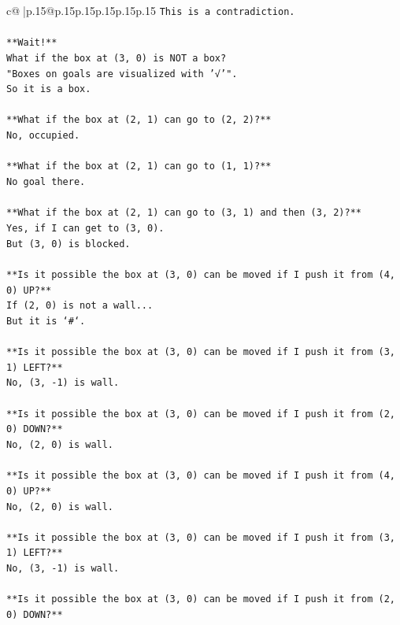 \documentclass{article}
\begin{document}
{\begin{supertabular}{c@{$\;$}|p{.15\linewidth}@{}p{.15\linewidth}p{.15\linewidth}p{.15\linewidth}p{.15\linewidth}p{.15\linewidth}}
{{{\texttt{This is a contradiction.} \\
\\ 
\texttt{**Wait!**} \\
\texttt{What if the box at (3, 0) is NOT a box?} \\
\texttt{"Boxes on goals are visualized with '√'".} \\
\texttt{So it is a box.} \\
\\ 
\texttt{**What if the box at (2, 1) can go to (2, 2)?**} \\
\texttt{No, occupied.} \\
\\ 
\texttt{**What if the box at (2, 1) can go to (1, 1)?**} \\
\texttt{No goal there.} \\
\\ 
\texttt{**What if the box at (2, 1) can go to (3, 1) and then (3, 2)?**} \\
\texttt{Yes, if I can get to (3, 0).} \\
\texttt{But (3, 0) is blocked.} \\
\\ 
\texttt{**Is it possible the box at (3, 0) can be moved if I push it from (4, 0) UP?**} \\
\texttt{If (2, 0) is not a wall...} \\
\texttt{But it is `\#`.} \\
\\ 
\texttt{**Is it possible the box at (3, 0) can be moved if I push it from (3, 1) LEFT?**} \\
\texttt{No, (3, {-}1) is wall.} \\
\\ 
\texttt{**Is it possible the box at (3, 0) can be moved if I push it from (2, 0) DOWN?**} \\
\texttt{No, (2, 0) is wall.} \\
\\ 
\texttt{**Is it possible the box at (3, 0) can be moved if I push it from (4, 0) UP?**} \\
\texttt{No, (2, 0) is wall.} \\
\\ 
\texttt{**Is it possible the box at (3, 0) can be moved if I push it from (3, 1) LEFT?**} \\
\texttt{No, (3, {-}1) is wall.} \\
\\ 
\texttt{**Is it possible the box at (3, 0) can be moved if I push it from (2, 0) DOWN?**} \\
}}}
\end{supertabular}}
\end{document}
